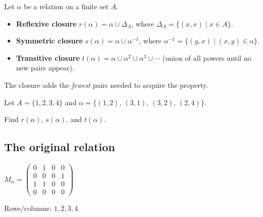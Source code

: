 \documentclass[12pt, a4paper]{article}
\begin{document}
\begin{theorybox}
Let $\alpha$ be a relation on a finite set $A$.
\begin{itemize}[nosep]
  \item \textbf{Reflexive closure} $r(\alpha) = \alpha \cup \Delta_A$, where $\Delta_A = \{(x,x) \mid x \in A\}$.
  \item \textbf{Symmetric closure} $s(\alpha) = \alpha \cup \alpha^{-1}$, where $\alpha^{-1} = \{(y,x) \mid (x,y) \in \alpha\}$.
  \item \textbf{Transitive closure} $t(\alpha) = \alpha \cup \alpha^2 \cup \alpha^3 \cup \cdots$\; (union of all powers until no new pairs appear).
\end{itemize}
The closure adds the \emph{fewest} pairs needed to acquire the property.
\end{theorybox}

\begin{problembox}
Let $A = \{1, 2, 3, 4\}$ and $\alpha = \{(1,2),\,(3,1),\,(3,2),\,(2,4)\}$.

Find $r(\alpha)$, $s(\alpha)$, and $t(\alpha)$.
\end{problembox}

\subsection*{The original relation}

\begin{center}
\begin{minipage}{0.45\textwidth}\centering
{}
\end{minipage}%
\begin{minipage}{0.45\textwidth}\centering
$M_\alpha = \begin{pmatrix}
  0 & 1 & 0 & 0 \\
  0 & 0 & 0 & 1 \\
  1 & 1 & 0 & 0 \\
  0 & 0 & 0 & 0
\end{pmatrix}$

{\small Rows/columns: $1,2,3,4$.}
\end{minipage}
\end{center}
\end{document}
